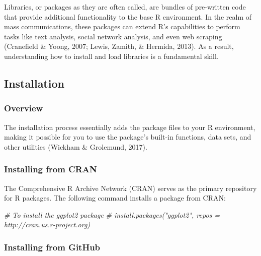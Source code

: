 \documentclass[
  b5paper]{book}
\newenvironment{Shaded}{\begin{snugshade}}{\end{snugshade}}
\newcommand{\CommentTok}[1]{\textcolor[rgb]{0.56,0.35,0.01}{\textit{#1}}}
\begin{document}
Libraries, or packages as they are often called, are bundles of pre-written code that provide additional functionality to the base R environment. In the realm of mass communications, these packages can extend R's capabilities to perform tasks like text analysis, social network analysis, and even web scraping (Cranefield \& Yoong, 2007; Lewis, Zamith, \& Hermida, 2013). As a result, understanding how to install and load libraries is a fundamental skill.

\hypertarget{installation}{%
\subsection*{Installation}\label{installation}}

\hypertarget{overview-6}{%
\subsubsection*{Overview}\label{overview-6}}

The installation process essentially adds the package files to your R environment, making it possible for you to use the package's built-in functions, data sets, and other utilities (Wickham \& Grolemund, 2017).

\hypertarget{installing-from-cran}{%
\subsubsection*{Installing from CRAN}\label{installing-from-cran}}

The Comprehensive R Archive Network (CRAN) serves as the primary repository for R packages. The following command installs a package from CRAN:

\begin{Shaded}
\begin{Highlighting}[]
\CommentTok{\# To install the ggplot2 package}
\CommentTok{\# install.packages("ggplot2", repos = \textquotesingle{}http://cran.us.r{-}project.org\textquotesingle{})}
\end{Highlighting}
\end{Shaded}

\hypertarget{installing-from-github}{%
\subsubsection*{Installing from GitHub}\label{installing-from-github}}
\end{document}
